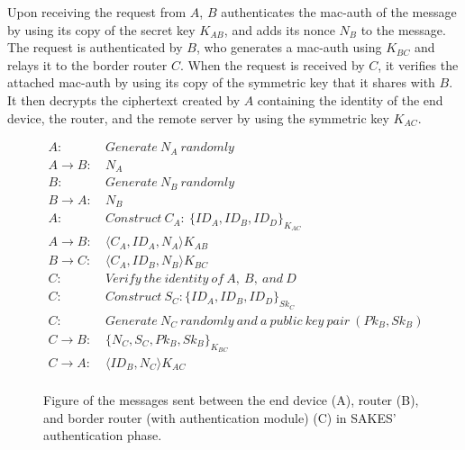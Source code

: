 Upon receiving the request from $A$, $B$ authenticates the \gls{mac-auth} of the message by using its copy of the secret key $K_{AB}$, and adds its nonce $N_B$ to the message. The request is authenticated by $B$, who generates a \gls{mac-auth} using $K_{BC}$ and relays it to the border router $C$. When the request is received by $C$, it verifies the attached \gls{mac-auth} by using its copy of the symmetric key that it shares with $B$. It then decrypts the ciphertext created by $A$ containing the identity of the end device, the router, and the remote server by using the symmetric key $K_{AC}$.


\begin{figure}[h]
\begin{tcolorbox}[title=Authentication in SAKES]
\begin{align*}
A:\ & Generate\ N_A\ randomly\\
A \rightarrow B:\ & N_A\\
B:\ & Generate\ N_B\ randomly\\
B \rightarrow A:\ & N_B\\
A:\ & Construct\ C_{A}:\ \{ID_A, ID_B, ID_D\}_{K_{AC}}\\
A \rightarrow B:\ & \langle{C_A, ID_A, N_A}\rangle{K_{AB}}\\
B \rightarrow C:\ & \langle{C_A, ID_B, N_B}\rangle{K_{BC}}\\
C:\ & Verify\ the\ identity\ of\ A,\ B,\ and\ D\\
C: \ & Construct\ S_C: \{ID_A, ID_B, ID_D\}_{Sk_{C}}\\
C:\ & Generate\ N_C\ randomly\ and\ a\ public\ key\ pair\ (Pk_B, Sk_B)\\
C \rightarrow B:\ & \{N_C, S_C, Pk_B, Sk_B\}_{K_{BC}}\\
C \rightarrow A:\ & \langle{ID_B, N_C}\rangle{K_{AC}}\\
\end{align*}
\end{tcolorbox}
\caption{Figure of the messages sent between the end device (A), router (B), and border router (with authentication module) (C) in SAKES' authentication phase.}
\label{fig:sakes-auth}
\end{figure}

